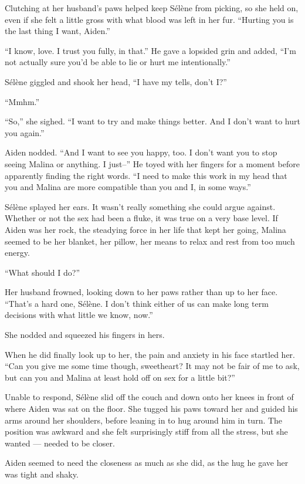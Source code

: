 Clutching at her husband's paws helped keep Sélène from picking, so she held on, even if she felt a little gross with what blood was left in her fur. ``Hurting you is the last thing I want, Aiden.''

``I know, love. I trust you fully, in that.'' He gave a lopsided grin and added, ``I'm not actually sure you'd be able to lie or hurt me intentionally.''

Sélène giggled and shook her head, ``I have my tells, don't I?''

``Mmhm.''

``So,'' she sighed. ``I want to try and make things better. And I don't want to hurt you again.''

Aiden nodded. ``And I want to see you happy, too. I don't want you to stop seeing Malina or anything. I just--'' He toyed with her fingers for a moment before apparently finding the right words. ``I need to make this work in my head that you and Malina are more compatible than you and I, in some ways.''

Sélène splayed her ears. It wasn't really something she could argue against. Whether or not the sex had been a fluke, it was true on a very base level. If Aiden was her rock, the steadying force in her life that kept her going, Malina seemed to be her blanket, her pillow, her means to relax and rest from too much energy.

``What should I do?''

Her husband frowned, looking down to her paws rather than up to her face. ``That's a hard one, Sélène. I don't think either of us can make long term decisions with what little we know, now.''

She nodded and squeezed his fingers in hers.

When he did finally look up to her, the pain and anxiety in his face startled her. ``Can you give me some time though, sweetheart? It may not be fair of me to ask, but can you and Malina at least hold off on sex for a little bit?''

Unable to respond, Sélène slid off the couch and down onto her knees in front of where Aiden was sat on the floor. She tugged his paws toward her and guided his arms around her shoulders, before leaning in to hug around him in turn. The position was awkward and she felt surprisingly stiff from all the stress, but she wanted --- needed to be closer.

Aiden seemed to need the closeness as much as she did, as the hug he gave her was tight and shaky.

